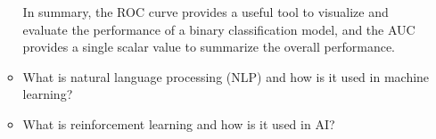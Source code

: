 \documentclass[11pt]{article}
\begin{document}
\begin{enumerate}
\begin{itemize}
In summary, the ROC curve provides a useful tool to visualize and evaluate the performance of a binary classification model, and the AUC provides a single scalar value to summarize the overall performance.
\item What is natural language processing (NLP) and how is it used in machine learning?
\item What is reinforcement learning and how is it used in AI?
\end{itemize} 






\end{enumerate}
















	
	\newpage
	
	
\end{document}
